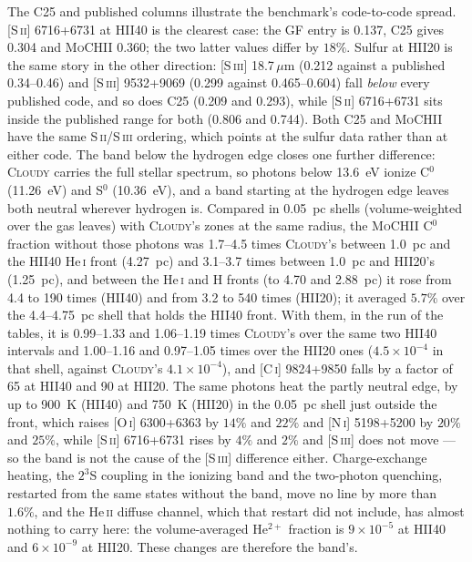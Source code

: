\documentclass[twocolumn,linenumbers]{aastex702}
\newcommand{\MoCHII}{\textsc{MoCHII}}
\newcommand{\HeI}{He\,\textsc{i}}
\newcommand{\HeII}{He\,\textsc{ii}}
\begin{document}
The C25 and published columns illustrate the benchmark's code-to-code
spread.  [S\,\textsc{ii}] 6716+6731 at
HII40 is the clearest case: the GF entry is 0.137, C25 gives 0.304 and
\MoCHII{} 0.360; the two latter values differ by $18\%$.  Sulfur at HII20 is
the same story in the other direction: [S\,\textsc{iii}] 18.7\,$\mu$m
(0.212 against a published 0.34--0.46) and [S\,\textsc{iii}] 9532+9069
(0.299 against 0.465--0.604) fall \emph{below} every published code, and so
does C25 (0.209 and 0.293), while [S\,\textsc{ii}] 6716+6731 sits inside the
published range for both (0.806 and 0.744).  Both C25 and \MoCHII{} have the
same S\,\textsc{ii}/S\,\textsc{iii} ordering, which points at the sulfur
data rather than at either code.  The band below the hydrogen edge closes
one further difference: \textsc{Cloudy} carries the full stellar spectrum,
so photons below 13.6~eV ionize C$^{0}$ (11.26~eV) and S$^{0}$ (10.36~eV),
and a band starting at the hydrogen edge leaves both neutral wherever
hydrogen is.  Compared in 0.05~pc shells (volume-weighted over the gas
leaves) with \textsc{Cloudy}'s zones at the same radius, the \MoCHII{}
C$^{0}$ fraction without those photons was 1.7--4.5 times
\textsc{Cloudy}'s between 1.0~pc and the HII40 \HeI{} front (4.27~pc) and
3.1--3.7 times between 1.0~pc and HII20's (1.25~pc), and between the
\HeI{} and H fronts (to 4.70 and 2.88~pc) it rose from 4.4 to 190 times
(HII40) and from 3.2 to 540 times (HII20); it averaged $5.7\%$ over the
4.4--4.75~pc shell that holds the HII40 front.  With them, in the run of
the tables, it is 0.99--1.33
and 1.06--1.19 times \textsc{Cloudy}'s over the same two HII40 intervals and
1.00--1.16 and 0.97--1.05 times over the HII20 ones ($4.5\times10^{-4}$ in
that shell, against \textsc{Cloudy}'s $4.1\times10^{-4}$), and
[C\,\textsc{i}] 9824+9850 falls by a factor of 65 at HII40 and 90 at HII20.
The same photons heat the partly neutral edge, by up to 900~K (HII40) and
750~K (HII20) in the 0.05~pc shell just outside the front, which raises [O\,\textsc{i}]
6300+6363 by $14\%$ and $22\%$ and [N\,\textsc{i}] 5198+5200 by $20\%$
and $25\%$, while [S\,\textsc{ii}] 6716+6731 rises by $4\%$ and $2\%$ and
[S\,\textsc{iii}] does not move --- so the band is not the cause of the
[S\,\textsc{iii}] difference either.  Charge-exchange heating, the $2^3$S
coupling in the ionizing band and the two-photon quenching, restarted from
the same states without the band, move no line by more than $1.6\%$, and
the \HeII{} diffuse channel, which that restart did not include, has almost
nothing to carry here: the volume-averaged He$^{2+}$ fraction is
$9\times10^{-5}$ at HII40 and $6\times10^{-9}$ at HII20.  These changes are
therefore the band's.
\end{document}
